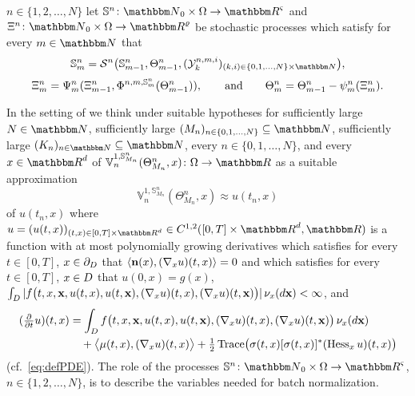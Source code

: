 \begin{algo}
	$n\in\{1,2,\ldots,N\}$
	let
	$\bS^{n}\colon\N_0\times\Omega\to\R^{\varsigma}$
	and
	$\Xi^{n}\colon\N_0\times\Omega\to\R^{\varrho}$
	be stochastic processes
	which satisfy for every $m\in\N$ that
	\begin{equation}\label{eq:general_batch_normalization}
	\bS^{n}_{m} = \S^{n}\bigl(\bS^{n}_{m-1}, \Theta^{n}_{m-1},
	(\Y_k^{n,m,i})_{(k,i)\in\{0,1,\ldots,N\}\times\N}\bigr),
	\end{equation}
	\begin{equation}
	\Xi^n_{m} = \Psi^n_{m}(\Xi^n_{m-1},\Phi^{n,m,\mathbb{S}^n_{m}}(\Theta^n_{m-1})),
	\qquad
	\text{and}
	\qquad
	\Theta^{n}_{m} = \Theta^{n}_{m-1} - \psi^n_{m}(\Xi^n_{m})
	\label{eq:general_gradient_step}.
	\end{equation}
\end{algo}
%
In the setting of  
we think under suitable hypotheses 
for sufficiently large
$N \in \N$,
sufficiently large
$(M_n)_{n\in \{0, 1, \ldots, N\}} \subseteq \N$, 
sufficiently large 
$(K_n)_{n\in \N} \subseteq \N$,
%
every
$n \in \{0, 1, \dots, N\}$, 
and every 
$x \in \R^d$
of 
$ \mathbb{V}^{1,\mathbb{S}_{M_n}^n}_n(\Theta^n_{M_n},x) \colon \Omega \to \R$ as a suitable approximation
\begin{equation}
\mathbb{V}^{1,\mathbb{S}_{M_n}^n}_n(\Theta^n_{M_n},x) \approx u(t_n,x)
\end{equation}
of $u(t_n,x)$ where
$
u=(u(t,x))_{(t,x)\in [0,T]\times\R^d}\in C^{1,2}([0,T]\times\R^d,\R)
$
is a function with at most  polynomially growing derivatives
%
which satisfies for every
$t\in [0,T]$,
$x\in \partial_D$
that
$ \left<{\textbf n}(x) ,(\nabla_x u)(t,x)\right> = 0$
and which satisfies for every
$t\in [0,T]$,
$x\in D$
that
$u(0,x)=g(x)$,
$\int_D |f\big(t,x,{\textbf x}, \allowbreak u(t,x), u(t,{\textbf x}), ( \nabla_x u )(t,x ),( \nabla_x u )(t,{\textbf x} ) \big) | \, \nu_x(d{\textbf x}) < \infty$,
and
\begin{equation}
\begin{split}
(\tfrac{\partial}{\partial t}u)(t,x)
&=
\int_{D} f\big(t,x,{\textbf x}, u(t,x),u(t,{\textbf x}), ( \nabla_x u )(t,x ),( \nabla_x u )(t,{\textbf x} ) \big) \, \nu_x(d{\textbf x}) \\
& \quad + \big\langle \mu(t,x), ( \nabla_x u )( t,x ) \big\rangle
+ \tfrac{ 1 }{ 2 }
\operatorname{Trace}\!\big(
\sigma(t,x) [ \sigma(t,x) ]^*
( \operatorname{Hess}_x u)( t,x )
\big)
\end{split}
\end{equation}
%
(cf.\ \eqref{eq:defPDE}).
%
The role of the processes $\mathbb{S}^n\colon \N_0\times\Omega \to \R^{\varsigma}$, $n\in\{1,2,\ldots,N\}$, is to describe the variables needed for batch normalization.


